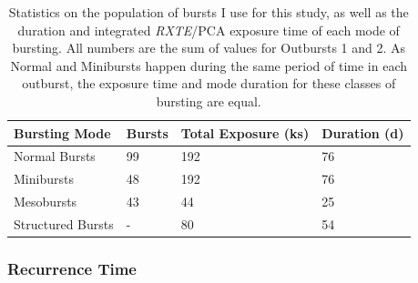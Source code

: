 \begin{table}
\centering
\begin{tabular}{llll}
\hline
\hline
\scriptsize  Bursting Mode &\scriptsize Bursts &\scriptsize Total Exposure (ks) &\scriptsize Duration (d) \\
\hline
Normal Bursts\index{Normal burst} & 99  & 192 & 76\\
Minibursts\index{Miniburst} & 48 & 192  & 76\\
Mesobursts\index{Mesoburst} & 43 &44 &25\\
Structured Bursts\index{Structured bursting} & - &80 &54 \\
\hline
\hline
\end{tabular}
\caption[Statistics on the population of bursts in the 1996 and 1997 outbursts of the Bursting Pulsar.]{Statistics on the population of bursts I use for this study, as well as the duration and integrated \indexpca\textit{RXTE}/PCA exposure time of each mode of bursting.  All numbers are the sum of values for Outbursts 1 and 2.  As Normal and Minibursts happen during the same period of time in each outburst, the exposure time and mode duration for these classes of bursting are equal.}
\label{tab:staretimes}
\end{table}

\subsubsection{Recurrence Time}

